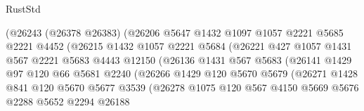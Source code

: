 \begin{lexlean}{RustStd}
\begin{coremodule}
                            (@26243
                              (@26378 @26383)
                              (@26206
                                @5647
                                @1432
                                @1097
                                @1057
                                @2221
                                @5685
                                @2221
                                @4452
                                (@26215
                                  @1432
                                  @1057
                                  @2221
                                  @5684
                                  (@26221
                                    @427
                                    @1057
                                    @1431
                                    @567
                                    @2221
                                    @5683
                                    @4443
                                    @12150
                                    (@26136
                                      @1431
                                      @567
                                      @5683
                                      (@26141
                                        @1429
                                        @97
                                        @120
                                        @66
                                        @5681
                                        @2240
                                        (@26266
                                          @1429
                                          @120
                                          @5670
                                          @5679
                                          (@26271
                                            @1428
                                            @841
                                            @120
                                            @5670
                                            @5677
                                            @3539
                                            (@26278
                                              @1075
                                              @120
                                              @567
                                              @4150
                                              @5669
                                              @5676
                                              @2288
                                              @5652
                                              @2294
                                              @26188

\end{coremodule}
\end{lexlean}
